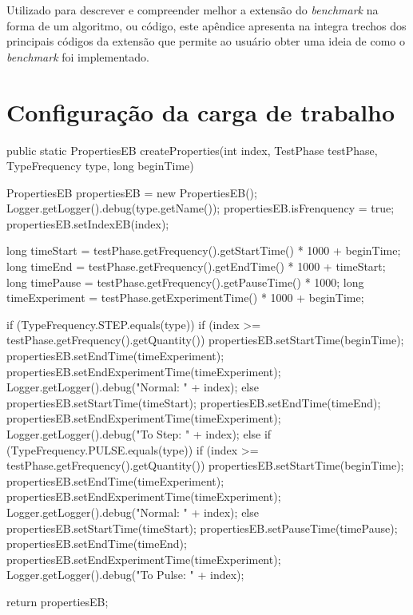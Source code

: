 \label{cap:ap-codigo}
Utilizado para descrever e compreender melhor a extensão do \textit{benchmark} na forma de um algoritmo, ou código, este apêndice apresenta na integra trechos dos principais códigos da extensão que permite ao usuário obter uma ideia de como o \textit{benchmark} foi implementado.

\section{Configuração da carga de trabalho}

\begin{codigo}[caption={Algoritmo calcula os tempos de inicialização e termino para cada um dos Clientes}, label={code:createProperties-all}, breaklines=true]
	public static PropertiesEB createProperties(int index, TestPhase testPhase, TypeFrequency type, long beginTime) {
		
		PropertiesEB propertiesEB = new PropertiesEB();
		Logger.getLogger().debug(type.getName());
		propertiesEB.isFrenquency = true;
		propertiesEB.setIndexEB(index);
		
		long timeStart = testPhase.getFrequency().getStartTime() * 1000 + beginTime;
		long timeEnd   = testPhase.getFrequency().getEndTime() * 1000 + timeStart;
		long timePause = testPhase.getFrequency().getPauseTime() * 1000;
		long timeExperiment = testPhase.getExperimentTime() * 1000 + beginTime;
		
		if (TypeFrequency.STEP.equals(type)) {
			if (index >= testPhase.getFrequency().getQuantity()) {
				propertiesEB.setStartTime(beginTime);
				propertiesEB.setEndTime(timeExperiment);
				propertiesEB.setEndExperimentTime(timeExperiment);
				Logger.getLogger().debug("Normal: " + index);
			} else {
			propertiesEB.setStartTime(timeStart);
			propertiesEB.setEndTime(timeEnd);
			propertiesEB.setEndExperimentTime(timeExperiment);
			Logger.getLogger().debug("To Step: " + index);
		}
	} else if (TypeFrequency.PULSE.equals(type)) {
	if (index >= testPhase.getFrequency().getQuantity()) {
		propertiesEB.setStartTime(beginTime);
		propertiesEB.setEndTime(timeExperiment);
		propertiesEB.setEndExperimentTime(timeExperiment);
		Logger.getLogger().debug("Normal: " + index);
	} else {
	propertiesEB.setStartTime(timeStart);
	propertiesEB.setPauseTime(timePause);
	propertiesEB.setEndTime(timeEnd);
	propertiesEB.setEndExperimentTime(timeExperiment);
	Logger.getLogger().debug("To Pulse: " + index);
}
}

return propertiesEB;

}

\end{codigo}

